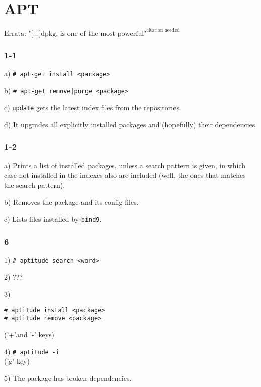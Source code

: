 \chapter{APT}
$\text{Errata: "[...]dpkg, is one of the most powerful"}^{\text{citation needed}}$
\subsection{1-1}
a) \verb=# apt-get install <package>=

b) \verb=# apt-get remove|purge <package>=

c) \verb=update= gets the latest index files from the repositories.

d) It upgrades all explicitly installed packages and (hopefully) their dependencies.

\subsection{1-2}
a) Prints a list of installed packages, unless a search pattern is given, in which case not installed in the indexes also are included (well, the ones that matches the search pattern).

b) Removes the package and its config files.

c) Lists files installed by \verb=bind9=.


%



\subsection{6}
1) \verb=# aptitude search <word>=

2) ???

3) \begin{verbatim}# aptitude install <package>
# aptitude remove <package>\end{verbatim}
('+'and '-' keys)

4) \verb=# aptitude -i=\\
('g'-key)

5) The package has broken dependencies.
